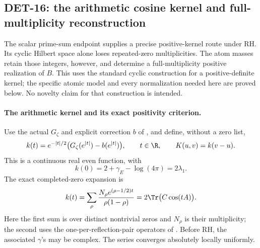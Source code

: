 \subsection{DET-16: the arithmetic cosine kernel and full-multiplicity reconstruction}
The scalar prime-sum endpoint supplies a precise positive-kernel route under
RH. Its cyclic Hilbert space alone loses repeated-zero multiplicities.
The atom masses retain those integers, however, and determine a
full-multiplicity positive realization of \(B\). This uses the standard
cyclic construction for a positive-definite kernel; the specific atomic
model and every normalization needed here are proved below. No novelty
claim for that construction is intended.

\paragraph{The arithmetic kernel and its exact positivity criterion.}
Use the actual \(G_\zeta\) and explicit correction \(b\) of
, and define, without a zero list,
\[
 k(t)=e^{-|t|/2}\bigl(G_\zeta(e^{|t|})-b(e^{|t|})\bigr),
 \qquad t\in\R,\qquad K(u,v)=k(v-u).
\]
This is a continuous real even function, with
\[
 k(0)=2+\gamma_E-\log(4\pi)=2\lambda_1.
\]
The exact completed-zero expansion is
\begin{equation}\label{eq:arithkernelzero}
 k(t)=\sum_\rho
 \frac{N_\rho e^{(\rho-1/2)t}}{\rho(1-\rho)}
 =2\Tr\bigl(C\cos(tA)\bigr).
\end{equation}
Here the first sum is over distinct nontrivial zeros and \(N_\rho\)
is their multiplicity; the second uses the one-per-reflection-pair
operators of . Before RH, the associated \(\gamma\)'s
may be complex. The series converges absolutely locally uniformly.

